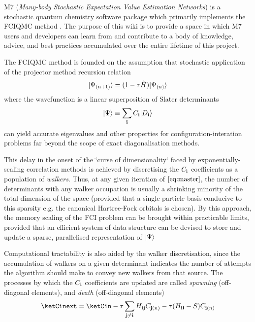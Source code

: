 M7 ({\itshape Many-\/body Stochastic Expectation Value Estimation Networks}) is a stochastic quantum chemistry software package which primarily implements the F\+C\+I\+Q\+MC method \cite{doi:10.1063/1.3193710}. The purpose of this wiki is to provide a space in which M7 users and developers can learn from and contribute to a body of knowledge, advice, and best practices accumulated over the entire lifetime of this project.

The F\+C\+I\+Q\+MC method is founded on the assumption that stochastic application of the projector method recursion relation \[ \label{eq:master} |\Psi_{(n+1)}\rangle = (1-\tau\hat{H})|\Psi_{(n)}\rangle \] where the wavefunction is a linear superposition of Slater determinants \[ \label{eq:psidef} |\Psi\rangle \equiv \sum_{\mathbf{i}} C_{\mathbf{i}} |D_{\mathbf{i}}\rangle \] can yield accurate eigenvalues and other properties for configuration-\/interation problems far beyond the scope of exact diagonalisation methods.

This delay in the onset of the \char`\"{}curse of dimensionality\char`\"{} faced by exponentially-\/scaling correlation methods is achieved by discretising the $C_{\mathbf{i}}$ coefficients as a population of {\itshape walkers}. Thus, at any given iteration of $\ref{eq:master}$, the number of determinants with any walker occupation is usually a shrinking minority of the total dimension of the space (provided that a single particle basis conducive to this sparsity e.\+g. the canonical Hartree-\/\+Fock orbitals is chosen). By this approach, the memory scaling of the F\+CI problem can be brought within practicable limits, provided that an efficient system of data structure can be devised to store and update a sparse, parallelised representation of $|\Psi\rangle$

Computational tractability is also aided by the walker discretisation, since the accumulation of walkers on a given determinant indicates the number of attempts the algorithm should make to convey new walkers from that source. The processes by which the $C_{\mathbf{i}}$ coefficients are updated are called {\itshape spawning} (off-\/diagonal elements), and {\itshape death} (off-\/diagonal elements) \[ \ketCinext = \ketCin - \tau \sum_{\bfj\neq\bfi} \Hij \Cjn - \tau(\Hii - S) \Cin \] 
